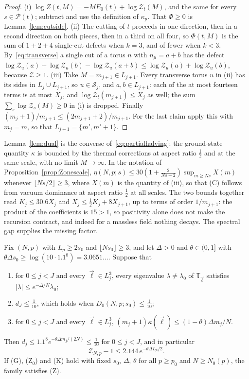 \begin{proof}
(i) $\log Z(t,M)=-ME_0(t)+\log\mathcal Z_t(M)$, and the same for every
$s\in\mathcal P(t)$; subtract and use the definition of $\kappa_p$. That
$\Phi\ge0$ is Lemma~\ref{lem:cutside}. (ii) The cutting of $t$ proceeds in
one direction, then in a second direction on both pieces, then in a third
on all four, so $\Phi(t,M)$ is the sum of $1+2+4$ single-cut defects when
$k=3$, and of fewer when $k<3$. By~\eqref{eq:transverse} a single cut of a
torus $n$ with $n_\mu=a+b$ has the defect $\log\mathcal Z_u(a)+\log\mathcal
Z_u(b)-\log\mathcal Z_u(a+b)\le\log\mathcal Z_u(a)+\log\mathcal Z_u(b)$,
because $\mathcal Z\ge1$. (iii) Take $M=m_{j+1}\in L_{j+1}$. Every
transverse torus $u$ in (ii) has its sides in $L_j\cup L_{j+1}$, so $u\in
\mathcal S_j$, and $a,b\in L_{j+1}$: each of the at most fourteen terms is
at most $X_j$, and $\log\mathcal Z_t(m_{j+1})\le X_j$ as well; the sum
$\sum_s\log\mathcal Z_s(M)\ge0$ in (i) is dropped. Finally $(m_j+1)/
m_{j+1}\le(2m_{j+1}+2)/m_{j+1}$. For the last claim apply this with
$m_j=m$, so that $L_{j+1}=\{m',m'+1\}$.
\end{proof}

Lemma~\ref{lem:dual} is the converse of~\eqref{eq:partialhalving}: the
ground-state quantity $\kappa$ is bounded by the thermal corrections at
aspect ratio $\frac12$ and at the same scale, with no limit $M\to\infty$. In
the notation of Proposition~\ref{prop:Zonescale}, $\eta(N,p;s)\le30(1+
\frac2{Ns-2})\sup_{m\ge Ns}X(m)$ whenever $\lfloor Ns/2\rfloor\ge3$, where
$X(m)$ is the quantity of (iii), so that (C) follows from vacuum dominance
at aspect ratio $\frac12$ at all scales. The two bounds together read
$K_j\le30.6X_j$ and $X_j\le\frac12K_j+8X_{j+1}$, up to terms of order
$1/m_{j+1}$: the product of the coefficients is $15>1$, so positivity
alone does not make the recursion contract, and indeed for a massless
field nothing decays. The spectral gap supplies the missing factor.

\begin{theorem}\label{thm:gapcasimir}
Fix $(N,p)$ with $L_p\ge2s_0$ and $\lfloor Ns_0\rfloor\ge3$, and let
$\Delta>0$ and $\theta\in(0,1]$ with $\theta\Delta s_0\ge\log(10\cdot1.1^8)
=3.0651\ldots$. Suppose that
\begin{enumerate}[leftmargin=*]
\item[\textup{(G)}] for $0\le j<J$ and every $\vec\ell\in L_j^3$, every
eigenvalue $\lambda\ne\lambda_0$ of $\mathbb T_{\vec\ell}$ satisfies
$|\lambda|\le e^{-\Delta/N}\lambda_0$;
\item[\textup{(Z$_0$)}] $d_J\le\frac1{10}$, which holds when $D_0(N,p;s_0)
\le\frac1{10}$;
\item[\textup{(K)}] for $0\le j<J$ and every $\vec\ell\in L_j^3$,
$(m_j+1)\kappa(\vec\ell)\le(1-\theta)\Delta m_j/N$.
\end{enumerate}
Then $d_j\le1.1^8e^{-\theta\Delta m_j/(2N)}\le\frac1{10}$ for $0\le j<J$,
and in particular
\[
\mathcal Z_{N,p}-1\le2.144\,e^{-\theta\Delta L_p/2}.
\]
If \textup{(G)}, \textup{(Z$_0$)} and \textup{(K)} hold with fixed $s_0$,
$\Delta$, $\theta$ for all $p\ge p_0$ and $N\ge N_0(p)$, the family
satisfies \textup{(Z)}.
\end{theorem}

